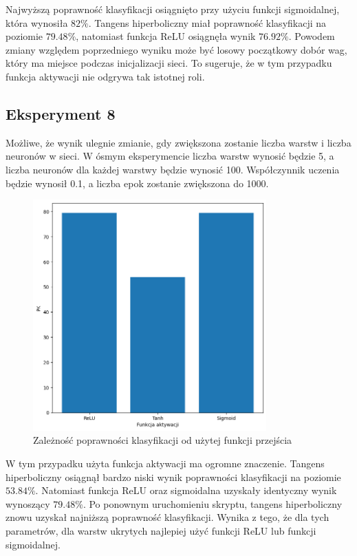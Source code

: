 \documentclass{article}
\begin{document}
Najwyższą poprawność klasyfikacji osiągnięto przy użyciu funkcji sigmoidalnej, która wynosiła $82\%$.
Tangens hiperboliczny miał poprawność klasyfikacji na poziomie $79.48\%$, natomiast funkcja ReLU osiągnęła wynik $76.92\%$.
Powodem zmiany względem poprzedniego wyniku może być losowy początkowy dobór wag, który ma miejsce podczas inicjalizacji sieci.
To sugeruje, że w tym przypadku funkcja aktywacji nie odgrywa tak istotnej roli.

\subsection{Eksperyment 8}
Możliwe, że wynik ulegnie zmianie, gdy zwiększona zostanie liczba warstw i liczba neuronów w sieci.
W ósmym eksperymencie liczba warstw wynosić będzie 5, a liczba neuronów dla każdej warstwy będzie wynosić 100.
Współczynnik uczenia będzie wynosił 0.1, a liczba epok zostanie zwiększona do 1000.

\begin{figure}[H]
    \centering
    \includegraphics[width=0.8\textwidth, keepaspectratio]{ACTIVATION_2_1.png}
    \caption{Zależność poprawności klasyfikacji od użytej funkcji przejścia}
    \label{fig:activ_2}
\end{figure}

W tym przypadku użyta funkcja aktywacji ma ogromne znaczenie.
Tangens hiperboliczny osiągnął bardzo niski wynik poprawności klasyfikacji na poziomie $53.84\%$.
Natomiast funkcja ReLU oraz sigmoidalna uzyskały identyczny wynik wynoszący $79.48\%$.
Po ponownym uruchomieniu skryptu, tangens hiperboliczny znowu uzyskał najniższą poprawność klasyfikacji.
Wynika z tego, że dla tych parametrów, dla warstw ukrytych najlepiej użyć funkcji ReLU lub funkcji sigmoidalnej.
\end{document}
